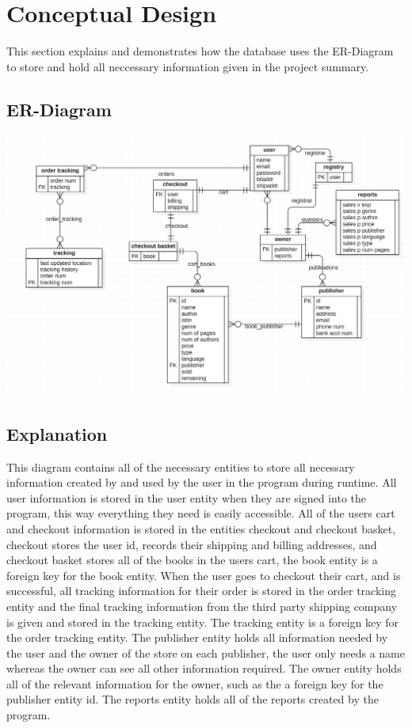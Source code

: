 \documentclass[a4 paper]{article}
\begin{document}

\tableofcontents
\newpage
\section{Conceptual Design}
\qquad This section explains and demonstrates how the database uses the ER-Diagram to store and hold all neccessary information given in the project summary. 
\subsection{ER-Diagram}
{\centering \includegraphics[width=\textwidth/1]{ER_D.png}}
\subsection{Explanation}
\qquad This diagram contains all of the necessary entities to store all necessary information created by and used by the user in the program during runtime. All user information is stored in the user entity when they are signed into the program, this way everything they need is easily accessible. All of the users cart and checkout information is stored in the entities checkout and checkout basket, checkout stores the user id, records their shipping and billing addresses, and checkout basket stores all of the books in the users cart, the book entity is a foreign key for the book entity. When the user goes to checkout their cart, and is successful, all tracking information for their order is stored in the order tracking entity and the final tracking information from the third party shipping company is given and stored in the tracking entity. The tracking entity is a foreign key for the order tracking entity. The publisher entity holds all information needed by the user and the owner of the store on each publisher, the user only needs a name whereas the owner can see all other information required. The owner entity holds all of the relevant information for the owner, such as the a foreign key for the publisher entity id. The reports entity holds all of the reports created by the program. 
\end{document}
